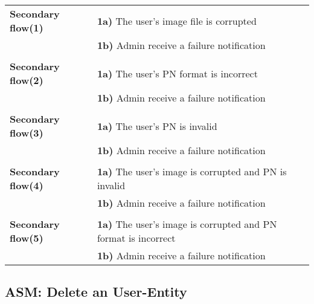 \documentclass[a4paper,11pt]{article}
\begin{document}
\begin{tabular}{|p{3.5cm}|p{11.5cm}|}
    \textbf{Secondary flow(1)} & 
    \textbf{1a)} The user's image file is corrupted \\&
    \textbf{1b)} Admin receive a failure notification
     
    \\ \hline \rowcolor{Gray} & \\ \hline 
     
    \textbf{Secondary flow(2)} & 
    \textbf{1a)} The user's PN format is incorrect \\&
    \textbf{1b)} Admin receive a failure notification
    
   \\ \hline \rowcolor{Gray} & \\ \hline
    
    \textbf{Secondary flow(3)} & 
    \textbf{1a)} The user's PN is invalid \\&
    \textbf{1b)} Admin receive a failure notification
    
    \\ \hline \rowcolor{Gray} & \\ \hline
    
    \textbf{Secondary flow(4)} & 
    \textbf{1a)} The user's image is corrupted and PN is invalid\\&
    \textbf{1b)} Admin receive a failure notification
    
    \\ \hline \rowcolor{Gray} & \\ \hline
    
    \textbf{Secondary flow(5)} & 
    \textbf{1a)} The user's image is corrupted and PN format is incorrect\\&
    \textbf{1b)} Admin receive a failure notification
    
    \\\hline 
\end{tabular}


\newpage
\noindent

\subsection{ASM: Delete an User-Entity}
\end{document}
